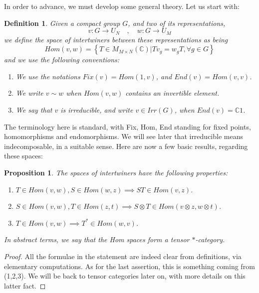\documentclass[12pt]{amsbook}
\newtheorem{definition}[theorem]{Definition}
\newtheorem{proposition}[theorem]{Proposition}
\begin{document}
In order to advance, we must develop some general theory. Let us start with:


\begin{definition}
Given a compact group $G$, and two of its representations,
$$v:G\to U_N\quad,\quad 
w:G\to U_M$$
we define the space of intertwiners between these representations as being 
$$Hom(v,w)=\left\{T\in M_{M\times N}(\mathbb C)\Big|Tv_g=w_gT,\forall g\in G\right\}$$
and we use the following conventions:
\begin{enumerate}
\item We use the notations $Fix(v)=Hom(1,v)$, and $End(v)=Hom(v,v)$.

\item We write $v\sim w$ when $Hom(v,w)$ contains an invertible element.

\item We say that $v$ is irreducible, and write $v\in Irr(G)$, when $End(v)=\mathbb C1$.
\end{enumerate}
\end{definition}

The terminology here is standard, with Fix, Hom, End standing for fixed points, homomorphisms and endomorphisms. We will see later that irreducible means indecomposable, in a suitable sense. Here are now a few basic results, regarding these spaces:


\begin{proposition}
The spaces of intertwiners have the following properties:
\begin{enumerate}
\item $T\in Hom(v,w),S\in Hom(w,z)\implies ST\in Hom(v,z)$.

\item $S\in Hom(v,w),T\in Hom(z,t)\implies S\otimes T\in Hom(v\otimes z,w\otimes t)$.

\item $T\in Hom(v,w)\implies T^*\in Hom(w,v)$.
\end{enumerate}
In abstract terms, we say that the Hom spaces form a tensor $*$-category.
\end{proposition}

\begin{proof}
All the formulae in the statement are indeed clear from definitions, via elementary computations. As for the last assertion, this is something coming from (1,2,3). We will be back to tensor categories later on, with more details on this latter fact.
\end{proof}
\end{document}
